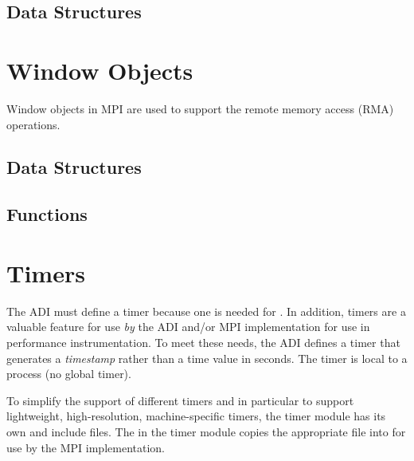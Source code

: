 \documentclass{article}
\begin{document}
%
\subsection{Data Structures}

%

\section{Window Objects}
\label{sec:window-objects}
Window objects in MPI are used to support the remote memory access
(RMA) operations.  
\subsection{Data Structures}

\subsection{Functions}


\section{Timers}
\label{sec:timers}
The ADI must define a timer because one is needed for .  In
addition, timers are a valuable feature for use \emph{by} the ADI and/or MPI
implementation for use in performance instrumentation.  To meet these needs,
the ADI defines 
a timer that generates a 
\emph{timestamp} rather than a time value in seconds.  
The timer is local to a process (no global timer).

To simplify the support of different timers and in particular to
support lightweight, high-resolution, machine-specific timers, the
timer module has its own  and include files.  The
 in the timer module copies the appropriate
 file into  for use by the
MPI implementation.
\end{document}
